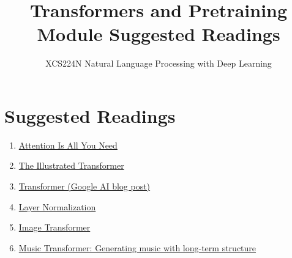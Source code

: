 \documentclass{article}
\title{Transformers and Pretraining Module Suggested Readings}
\author{XCS224N Natural Language Processing with Deep Learning}
\date{}
\begin{document}
\maketitle

\section{Suggested Readings}
\begin{enumerate}
    \item \href{https://arxiv.org/pdf/1706.03762.pdf}{Attention Is All You Need}
    \item \href{https://jalammar.github.io/illustrated-transformer/}{The Illustrated Transformer}
    \item \href{https://ai.googleblog.com/2017/08/transformer-novel-neural-network.html}{Transformer (Google AI blog post)}
    \item \href{https://arxiv.org/pdf/1607.06450.pdf}{Layer Normalization}
    \item \href{https://arxiv.org/pdf/1802.05751.pdf}{Image Transformer}
    \item \href{https://arxiv.org/pdf/1809.04281.pdf}{Music Transformer: Generating music with long-term structure}
\end{enumerate}
\end{document}
